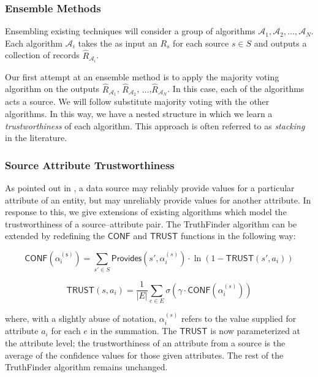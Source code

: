 \documentclass{acm_proc_article-sp}
\begin{document}
\vspace{1 cm}
\subsubsection{Ensemble Methods}

Ensembling existing techniques will consider a group of algorithms $\mathcal{A}_1,\mathcal{A}_2,\dots,\mathcal{A}_N$. Each algorithm $\mathcal{A}_i$ takes the as input an $R_s$ for each source $s \in S$ and outputs a collection of records $\hat{R}_{\mathcal{A}_i}$. 

Our first attempt at an ensemble method is to apply the majority voting algorithm on the outputs $\hat{R}_{\mathcal{A}_1}$, $\hat{R}_{\mathcal{A}_2}$, $\dots$,$\hat{R}_{\mathcal{A}_N}$. In this case, each of the algorithms acts a source. We will follow substitute majority voting with the other algorithms. In this way, we have a nested structure in which we learn a \emph{trustworthiness} of each algorithm. This approach is often referred to as \emph{stacking} in the literature. 

\subsubsection{Source Attribute Trustworthiness}

As pointed out in \cite{li:truth}, a data source may reliably provide values for a particular attribute of an entity, but may unreliably provide values for another attribute. In response to this, we give extensions of existing algorithms which model the trustworthiness of a source--attribute pair.  The {\sc TruthFinder} algorithm can be extended by redefining the $\mathsf{CONF}$ and $\mathsf{TRUST}$ functions in the following way: 


\begin{equation}
\mathsf{CONF(\alpha_i^{(s)})} = \sum_{s' \in S} \mathsf{Provides}(s',\alpha_i^{(s)}) \cdot \ln(1-\mathsf{TRUST}(s',a_i))
\end{equation}


\begin{equation}
\mathsf{TRUST}(s,a_i) = \frac{1}{|E|} \sum_{e \in E} \sigma(\gamma \cdot \mathsf{CONF}(\alpha_i^{(s)}))
\end{equation}

where, with a slightly abuse of notation, $\alpha_i^{(s)}$ refers to the value supplied for attribute $a_i$ for each $e$ in the summation. The  $\mathsf{TRUST}$ is now parameterized at the attribute level; the trustworthiness of an attribute from a source is the average of the confidence values for those given attributes. The rest of the {\sc TruthFinder} algorithm remains unchanged. 
\end{document}
